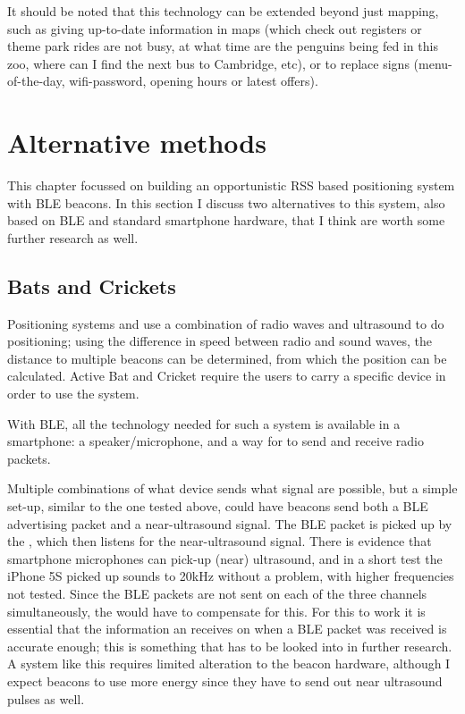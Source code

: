 It should be noted that this technology can be extended beyond just mapping, such as giving up-to-date information in maps (which check out registers or theme park rides are not busy, at what time are the penguins being fed in this zoo, where can I find the next bus to Cambridge, etc), or to replace signs (menu-of-the-day, wifi-password, opening hours or latest offers). 

\section{Alternative methods}
\label{sec:architecture-alternative}
This chapter focussed on building an opportunistic RSS based positioning system with BLE beacons.
In this section I discuss two alternatives to this system, also based on BLE and standard smartphone hardware, that I think are worth some further research as well.

\subsection{\BLE Bats and Crickets}
\label{sec:architecture-bats}

Positioning systems  \citep{harter2002anatomy} and  \citep{priyantha2000cricket} use a combination of radio waves and ultrasound to do positioning; using the difference in speed between radio and sound waves, the distance to multiple beacons can be determined, from which the position can be calculated.
Active Bat and Cricket require the users to carry a specific device in order to use the system.

With BLE, all the technology needed for such a system is available in a smartphone: a speaker/microphone, and a way for \apps to send and receive radio packets.

Multiple combinations of what device sends what signal are possible, but a simple set-up, similar to the one tested above, could have beacons send both a BLE advertising packet and a near-ultrasound signal.
The BLE packet is picked up by the \device, which then listens for the near-ultrasound signal.
There is evidence that smartphone microphones can pick-up (near) ultrasound\citep{arentz2011near,bihler2011smartguide}, and in a short test the iPhone 5S picked up sounds to 20kHz without a problem, with higher frequencies not tested.
Since the BLE packets are not sent on each of the three channels simultaneously, the \device would have to compensate for this.
For this to work it is essential that the information an \app receives on when a BLE packet was received is accurate enough; this is something that has to be looked into in further research.
A system like this requires limited alteration to the beacon hardware, although I expect beacons to use more energy since they have to send out near ultrasound pulses as well.

